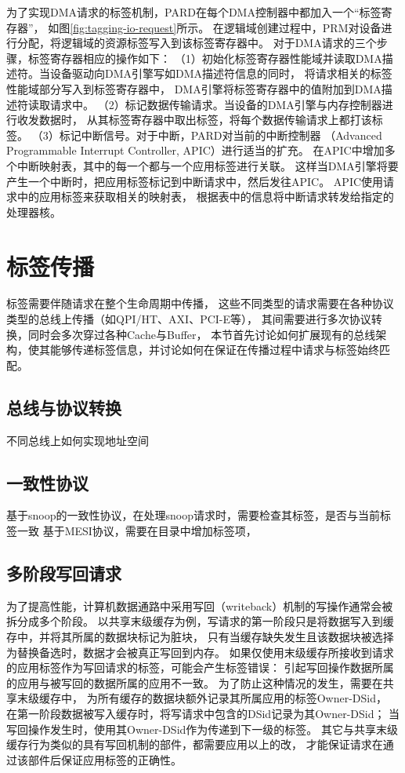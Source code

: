 为了实现DMA请求的标签机制，PARD在每个DMA控制器中都加入一个“标签寄存器”，
如图\ref{fig:tagging-io-request}所示。
在逻辑域创建过程中，PRM对设备进行分配，将逻辑域的资源标签写入到该标签寄存器中。
对于DMA请求的三个步骤，标签寄存器相应的操作如下：
（1）初始化标签寄存器性能域并读取DMA描述符。当设备驱动向DMA引擎写如DMA描述符信息的同时，
将请求相关的标签性能域部分写入到标签寄存器中，
DMA引擎将标签寄存器中的值附加到DMA描述符读取请求中。
（2）标记数据传输请求。当设备的DMA引擎与内存控制器进行收发数据时，
从其标签寄存器中取出标签，将每个数据传输请求上都打该标签。
（3）标记中断信号。对于中断，PARD对当前的中断控制器
（Advanced Programmable Interrupt Controller, APIC）进行适当的扩充。
在APIC中增加多个中断映射表，其中的每一个都与一个应用标签进行关联。
这样当DMA引擎将要产生一个中断时，把应用标签标记到中断请求中，然后发往APIC。
APIC使用请求中的应用标签来获取相关的映射表，
根据表中的信息将中断请求转发给指定的处理器核。


\section{标签传播}

标签需要伴随请求在整个生命周期中传播，
这些不同类型的请求需要在各种协议类型的总线上传播（如QPI/HT、AXI、PCI-E等），
其间需要进行多次协议转换，同时会多次穿过各种Cache与Buffer，
本节首先讨论如何扩展现有的总线架构，使其能够传递标签信息，并讨论如何在保证在传播过程中请求与标签始终匹配。

\subsection{总线与协议转换}

不同总线上如何实现地址空间

\subsection{一致性协议}

基于snoop的一致性协议，在处理snoop请求时，需要检查其标签，是否与当前标签一致
基于MESI协议，需要在目录中增加标签项，

\subsection{多阶段写回请求}

为了提高性能，计算机数据通路中采用写回（writeback）机制的写操作通常会被拆分成多个阶段。
以共享末级缓存为例，写请求的第一阶段只是将数据写入到缓存中，并将其所属的数据块标记为脏块，
只有当缓存缺失发生且该数据块被选择为替换备选时，数据才会被真正写回到内存。
如果仅使用末级缓存所接收到请求的应用标签作为写回请求的标签，可能会产生标签错误：
引起写回操作数据所属的应用与被写回的数据所属的应用不一致。
为了防止这种情况的发生，需要在共享末级缓存中，
为所有缓存的数据块额外记录其所属应用的标签Owner-DSid，
在第一阶段数据被写入缓存时，将写请求中包含的DSid记录为其Owner-DSid；
当写回操作发生时，使用其Owner-DSid作为传递到下一级的标签。
其它与共享末级缓存行为类似的具有写回机制的部件，都需要应用以上的改，
才能保证请求在通过该部件后保证应用标签的正确性。

